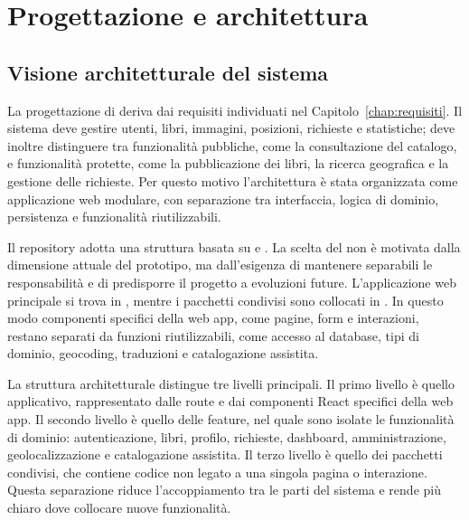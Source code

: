 \chapter{Progettazione e architettura}
\label{chap:progettazione-architettura}

\section{Visione architetturale del sistema}
\label{sec:visione-architetturale}

La progettazione di \projectname{} deriva dai requisiti individuati nel Capitolo~\ref{chap:requisiti}. Il sistema deve gestire utenti, libri, immagini, posizioni, richieste e statistiche; deve inoltre distinguere tra funzionalità pubbliche, come la consultazione del catalogo, e funzionalità protette, come la pubblicazione dei libri, la ricerca geografica e la gestione delle richieste. Per questo motivo l'architettura è stata organizzata come applicazione web modulare, con separazione tra interfaccia, logica di dominio, persistenza e funzionalità riutilizzabili.

Il repository adotta una struttura \monorepo{} basata su \nx{} e . La scelta del \monorepo{} non è motivata dalla dimensione attuale del prototipo, ma dall'esigenza di mantenere separabili le responsabilità e di predisporre il progetto a evoluzioni future. L'applicazione web principale si trova in , mentre i pacchetti condivisi sono collocati in . In questo modo componenti specifici della web app, come pagine, form e interazioni, restano separati da funzioni riutilizzabili, come accesso al database, tipi di dominio, geocoding, traduzioni e catalogazione assistita.

La struttura architetturale distingue tre livelli principali. Il primo livello è quello applicativo, rappresentato dalle route \nextjs{} e dai componenti React specifici della web app. Il secondo livello è quello delle feature, nel quale sono isolate le funzionalità di dominio: autenticazione, libri, profilo, richieste, dashboard, amministrazione, geolocalizzazione e catalogazione assistita. Il terzo livello è quello dei pacchetti condivisi, che contiene codice non legato a una singola pagina o interazione. Questa separazione riduce l'accoppiamento tra le parti del sistema e rende più chiaro dove collocare nuove funzionalità.

